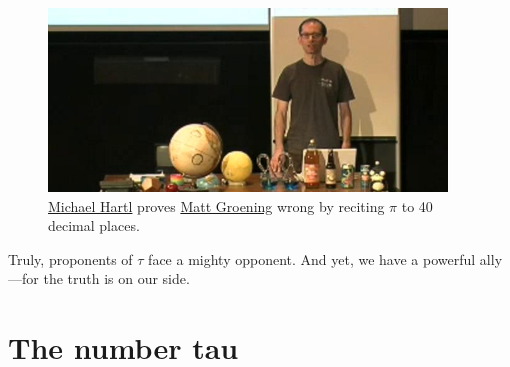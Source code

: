 \begin{figure}
\begin{center}
\includegraphics{images/figures/futurama_math_lecture.png} %
\end{center}
\caption{\href{\#sec:about_the_author}{Michael Hartl} proves \href{http://en.wikipedia.org/wiki/Matt_Groening}{Matt Groening} wrong by reciting $\pi$ to 40 decimal places.\label{fig:futurama_video}}
\end{figure}

Truly, proponents of $\tau$ face a mighty opponent. And yet, we have a powerful ally---for the truth is on our side.


\section{The number tau} %
\label{sec:the_number_tau}

